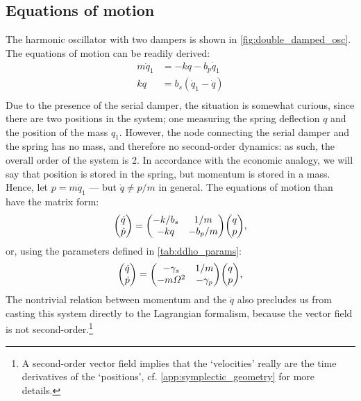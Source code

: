 \subsection{Equations of motion}
The harmonic oscillator with two dampers is shown in \cref{fig:double_damped_osc}. The equations of motion can be readily derived:
\begin{equation}
    \begin{split}
        m\ddot{q}_1 &= -kq - b_p \dot{q}_1 \\
        kq &= b_s(\dot{q}_1 - \dot{q}) \\
    \end{split}
\end{equation}
Due to the presence of the serial damper, the situation is somewhat curious, since there are two positions in the system; one measuring the spring deflection $q$ and the position of the mass $q_1$. However, the node connecting the serial damper and the spring has no mass, and therefore no second-order dynamics: as such, the overall order of the system is 2. In accordance with the economic analogy, we will say that position is stored in the spring, but momentum is stored in a mass. Hence, let $p = m\dot{q}_1$ --- but $\dot{q} \neq p/m$ in general. The equations of motion than have the matrix form:
\begin{equation*}
    \mqty(\dot{q}\\\dot{p}) = \mqty(-k/b_s & 1/m \\ -kq & - b_p/m)\mqty(q \\ p),
\end{equation*}
or, using the parameters defined in \cref{tab:ddho_params}:
\begin{equation}
    \mqty(\dot{q}\\\dot{p}) = \mqty(-\gamma_s & 1/m \\ -m\Omega^2 & - \gamma_p)\mqty(q \\ p),
\end{equation}
The nontrivial relation between momentum and the $\dot{q}$ also precludes us from casting this system directly to the Lagrangian formalism, because the vector field is not second-order.\footnote{A second-order vector field implies that the `velocities' really are the time derivatives of the `positions',  cf. \cref{app:symplectic_geometry} for more details.}

